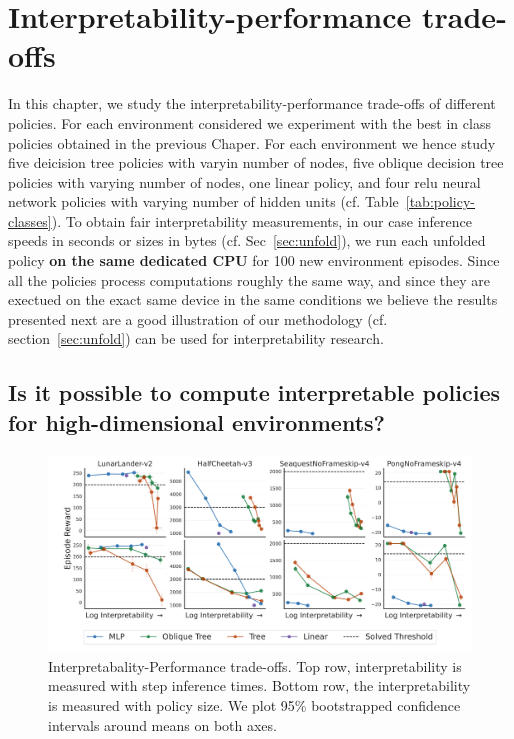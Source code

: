 \chapter{Interpretability-performance trade-offs}\label{sec:exps2}
In this chapter, we study the interpretability-performance trade-offs of different policies.
For each environment considered we experiment with the best in class policies obtained in the previous Chaper.  
For each environment we hence study five deicision tree policies with varyin number of nodes, five oblique decision tree policies with varying number of nodes, one linear policy, and four relu neural network policies with varying number of hidden units (cf. Table~\ref{tab:policy-classes}).
To obtain fair interpretability measurements, in our case inference speeds in seconds or sizes in bytes (cf. Sec~\ref{sec:unfold}), we run each unfolded policy \textbf{on the same dedicated CPU} for 100 new environment episodes.
Since all the policies process computations roughly the same way, and since they are exectued on the exact same device in the same conditions we believe the results presented next are a good illustration of our methodology (cf. section~\ref{sec:unfold}) 
can be used for interpretability research.
\section{Is it possible to compute interpretable policies for high-dimensional environments?}

\begin{figure}
    \centering
    \includegraphics[trim={1.4cm 0 0 0},clip,width=1\textwidth]{images/images_part3/trade_off_select_combine_one_plot.pdf}
    \caption{Interpretabality-Performance trade-offs. Top row, interpretability is measured with step inference times. Bottom row, the interpretability is measured with policy size. We plot 95\% bootstrapped confidence intervals around means on both axes.}
    \label{fig:trade-off-summary}
\end{figure}

